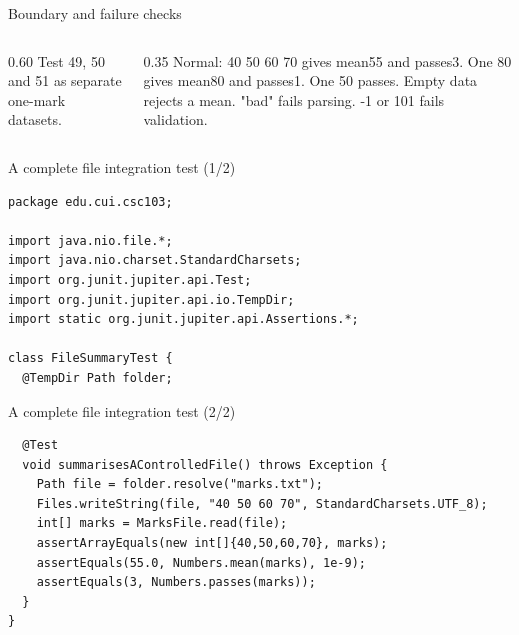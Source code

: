 \documentclass[10pt,aspectratio=169]{beamer}
\begin{document}
\begin{frame}[fragile,t]{Boundary and failure checks}
\begin{columns}[T,onlytextwidth]\begin{column}{0.60\textwidth}
Test 49, 50 and 51 as separate one-mark datasets.
\end{column}\begin{column}{0.35\textwidth}\small
Normal: 40 50 60 70 gives mean55 and passes3. One 80 gives mean80 and passes1. One 50 passes. Empty data rejects a mean. "bad" fails parsing. -1 or 101 fails validation.
\end{column}\end{columns}
\end{frame}

\begin{frame}[fragile,t]{A complete file integration test (1/2)}
\begin{lstlisting}
package edu.cui.csc103;

import java.nio.file.*;
import java.nio.charset.StandardCharsets;
import org.junit.jupiter.api.Test;
import org.junit.jupiter.api.io.TempDir;
import static org.junit.jupiter.api.Assertions.*;

class FileSummaryTest {
  @TempDir Path folder;

\end{lstlisting}
\end{frame}

\begin{frame}[fragile,t]{A complete file integration test (2/2)}
\begin{lstlisting}
  @Test
  void summarisesAControlledFile() throws Exception {
    Path file = folder.resolve("marks.txt");
    Files.writeString(file, "40 50 60 70", StandardCharsets.UTF_8);
    int[] marks = MarksFile.read(file);
    assertArrayEquals(new int[]{40,50,60,70}, marks);
    assertEquals(55.0, Numbers.mean(marks), 1e-9);
    assertEquals(3, Numbers.passes(marks));
  }
}
\end{lstlisting}
\end{frame}
\end{document}
